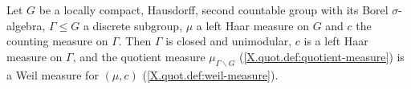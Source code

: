 Let $G$ be a locally compact, Hausdorff, second countable group with its Borel $\sigma$-algebra, $\Gamma\le G$ a discrete
subgroup, $\mu$ a left Haar measure on $G$ and $c$ the counting measure on $\Gamma$. Then $\Gamma$ is closed and unimodular, $c$ is
a left Haar measure on $\Gamma$, and the quotient measure $\mu_{\Gamma\backslash G}$ (\cref{X.quot.def:quotient-measure}) is a Weil
measure for $(\mu,c)$ (\cref{X.quot.def:weil-measure}).
